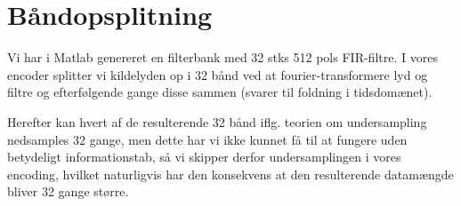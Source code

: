 \section{Båndopsplitning}
Vi har i Matlab genereret en filterbank med 32 stks 512 pols FIR-filtre. I vores encoder splitter vi kildelyden op i 32 bånd ved at fourier-transformere lyd og filtre og efterfølgende gange disse sammen (svarer til foldning i tidsdomænet).

Herefter kan hvert af de resulterende 32 bånd iflg. teorien om undersampling nedsamples 32 gange, men dette har vi ikke kunnet få til at fungere uden betydeligt informationstab, så vi skipper derfor undersamplingen i vores encoding, hvilket naturligvis har den konsekvens at den resulterende datamængde bliver 32 gange større.
